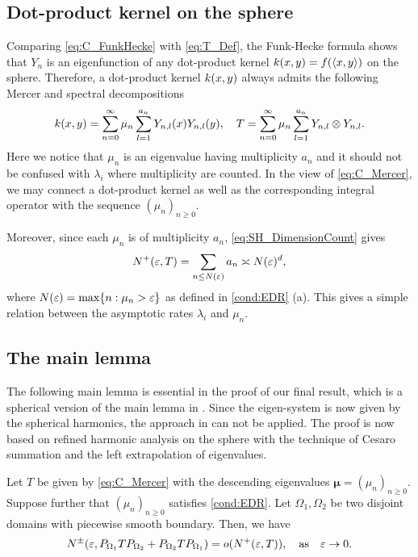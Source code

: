\subsection{Dot-product kernel on the sphere}
Comparing \cref{eq:C_FunkHecke} with \cref{eq:T_Def},
the Funk-Hecke formula shows that $Y_n$ is an eigenfunction of any dot-product kernel $k(x,y) = f(\left\langle{x,y}\right\rangle)$ on the sphere.
Therefore, a dot-product kernel $k(x,y)$ always admits the following Mercer and spectral decompositions
\begin{align}
  \label{eq:C_Mercer}
  k(x,y) = \sum_{n=0}^{\infty} \mu_n \sum_{l=1}^{a_n} Y_{n,l}(x)Y_{n,l}(y),
  \quad
  T = \sum_{n=0}^{\infty} \mu_n \sum_{l=1}^{a_n} Y_{n,l} \otimes Y_{n,l}.
\end{align}
Here we notice that $\mu_n$ is an eigenvalue having multiplicity $a_n$ and it should not be confused with $\lambda_i$
where multiplicity are counted.
In the view of \cref{eq:C_Mercer}, we may connect a dot-product kernel as well as the corresponding integral operator with the sequence
$(\mu_n)_{n \geq 0}$.


Moreover, since each $\mu_n$ is of multiplicity $a_n$, \cref{eq:SH_DimensionCount} gives
\begin{align}
  \label{eq:ConnectionMultiplicity}
  N^+(\varepsilon,T) = \sum_{n \leq N(\varepsilon)} a_n \asymp N(\varepsilon)^d,
\end{align}
where $N(\varepsilon) = \max \{n : \mu_n > \varepsilon\}$ as defined in \cref{cond:EDR} (a).
This gives a simple relation between the asymptotic rates $\lambda_i$ and $\mu_n$.

\subsection{The main lemma}
The following main lemma is essential in the proof of our final result,
which is a spherical version of the main lemma in \citet{widom1963_AsymptoticBehavior}.
Since the eigen-system is now given by the spherical harmonics,
the approach in \citet{widom1963_AsymptoticBehavior} can not be applied.
The proof is now based on refined harmonic analysis on the sphere with the technique of Cesaro summation and the left extrapolation of eigenvalues.

\begin{lemma}
  \label{lem:EDRS_MainLemma}
  Let $T$ be given by \cref{eq:C_Mercer} with the descending eigenvalues $\bm{\mu} = (\mu_n)_{n \geq 0}$.
  Suppose further that $(\mu_n)_{n \geq 0}$ satisfies \cref{cond:EDR}.
  Let $\Omega_1,\Omega_2$ be two disjoint domains with piecewise smooth boundary.
  Then, we have
  \begin{align}
    N^{\pm}(\ep,P_{\Omega_1}T P_{\Omega_2}+P_{\Omega_2}T P_{\Omega_1}) = o(N^+(\ep,T)),\qq{as} \ep \to 0.
  \end{align}

\end{lemma}

